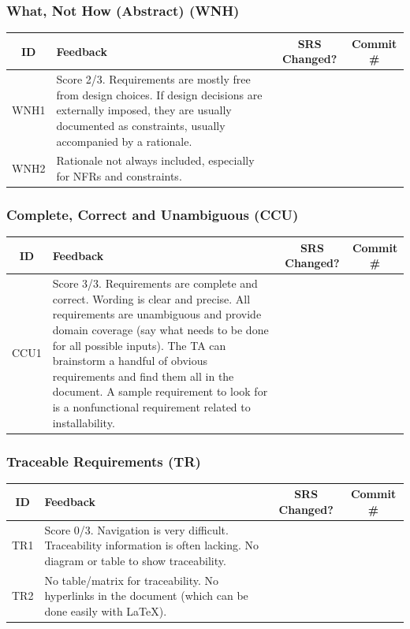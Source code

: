 \documentclass{article}
\begin{document}
\subsubsection{What, Not How (Abstract) (WNH)}
\begin{table}[h!]
\centering
\begin{tabular}{|c|p{8cm}|c|c|}
\hline
\textbf{ID} & \textbf{Feedback} & \textbf{SRS Changed?} & \textbf{Commit \#} \\ \hline
WNH1 & Score 2/3. Requirements are mostly free from design choices. If design decisions are externally imposed, they are usually documented as constraints, usually accompanied by a rationale. & & \\ \hline
WNH2 & Rationale not always included, especially for NFRs and constraints. & & \\ \hline
\end{tabular}
\end{table}

\subsubsection{Complete, Correct and Unambiguous (CCU)}
\begin{table}[h!]
\centering
\begin{tabular}{|c|p{8cm}|c|c|}
\hline
\textbf{ID} & \textbf{Feedback} & \textbf{SRS Changed?} & \textbf{Commit \#} \\ \hline
CCU1 & Score 3/3. Requirements are complete and correct. Wording is clear and precise. All requirements are unambiguous and provide domain coverage (say what needs to be done for all possible inputs). The TA can brainstorm a handful of obvious requirements and find them all in the document. A sample requirement to look for is a nonfunctional requirement related to installability. & & \\ \hline
\end{tabular}
\end{table}

\subsubsection{Traceable Requirements (TR)}
\begin{table}[h!]
\centering
\begin{tabular}{|c|p{8cm}|c|c|}
\hline
\textbf{ID} & \textbf{Feedback} & \textbf{SRS Changed?} & \textbf{Commit \#} \\ \hline
TR1 & Score 0/3. Navigation is very difficult. Traceability information is often lacking. No diagram or table to show traceability. & & \\ \hline
TR2 & No table/matrix for traceability. No hyperlinks in the document (which can be done easily with LaTeX). & & \\ \hline
\end{tabular}
\end{table}
\end{document}
